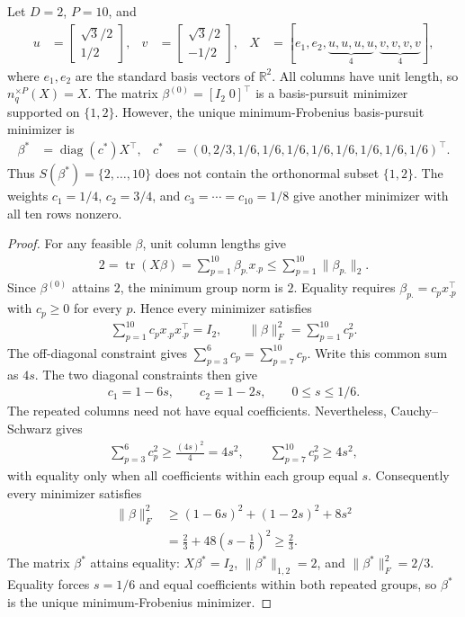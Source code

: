 \begin{example}
\label{example:min_norm_support_failure}
Let $D=2$, $P=10$, and
\begin{align}
u&=\begin{bmatrix}\sqrt3/2\\1/2\end{bmatrix}, &
v&=\begin{bmatrix}\sqrt3/2\\-1/2\end{bmatrix}, &
X&=[e_1,e_2,\underbrace{u,u,u,u}_{4},\underbrace{v,v,v,v}_{4}],
\end{align}
where $e_1,e_2$ are the standard basis vectors of $\mathbb R^2$.
All columns have unit length, so $n_q^{\times P}(X)=X$.
The matrix $\beta^{(0)}=[I_2\;0]^\top$ is a basis-pursuit minimizer supported on $\{1,2\}$.
However, the unique minimum-Frobenius basis-pursuit minimizer is
\begin{align}
\beta^*&=\operatorname{diag}(c^*)X^\top, &
c^*&=(0,2/3,1/6,1/6,1/6,1/6,1/6,1/6,1/6,1/6)^\top.
\end{align}
Thus $S(\beta^*)=\{2,\ldots,10\}$ does not contain the orthonormal subset $\{1,2\}$.
The weights $c_1=1/4$, $c_2=3/4$, and $c_3=\cdots=c_{10}=1/8$ give another minimizer with all ten rows nonzero.
\end{example}

\begin{proof}
For any feasible $\beta$, unit column lengths give
\begin{align}
2=\operatorname{tr}(X\beta)
=\sum_{p=1}^{10}\beta_{p.}x_{.p}
\leq\sum_{p=1}^{10}\|\beta_{p.}\|_2.
\end{align}
Since $\beta^{(0)}$ attains $2$, the minimum group norm is $2$.
Equality requires $\beta_{p.}=c_p x_{.p}^\top$ with $c_p\geq0$ for every $p$.
Hence every minimizer satisfies
\begin{align}
\sum_{p=1}^{10}c_p x_{.p}x_{.p}^\top=I_2,
\qquad \|\beta\|_F^2=\sum_{p=1}^{10}c_p^2.
\end{align}
The off-diagonal constraint gives $\sum_{p=3}^6c_p=\sum_{p=7}^{10}c_p$.
Write this common sum as $4s$.
The two diagonal constraints then give
\begin{align}
c_1=1-6s,\qquad c_2=1-2s,\qquad 0\leq s\leq1/6.
\end{align}
The repeated columns need not have equal coefficients.
Nevertheless, Cauchy--Schwarz gives
\begin{align}
\sum_{p=3}^6c_p^2\geq\frac{(4s)^2}{4}=4s^2,
\qquad
\sum_{p=7}^{10}c_p^2\geq4s^2,
\end{align}
with equality only when all coefficients within each group equal $s$.
Consequently every minimizer satisfies
\begin{align}
\|\beta\|_F^2
&\geq(1-6s)^2+(1-2s)^2+8s^2 \\
&=\frac23+48\left(s-\frac16\right)^2
\geq\frac23.
\end{align}
The matrix $\beta^*$ attains equality: $X\beta^*=I_2$, $\|\beta^*\|_{1,2}=2$, and $\|\beta^*\|_F^2=2/3$.
Equality forces $s=1/6$ and equal coefficients within both repeated groups, so $\beta^*$ is the unique minimum-Frobenius minimizer.
\end{proof}

